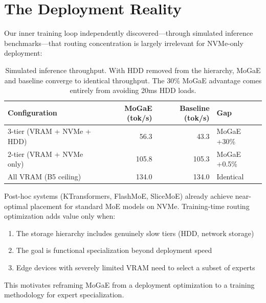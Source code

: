 \documentclass{article}
\begin{document}
\section{The Deployment Reality}

Our inner training loop independently discovered---through simulated inference benchmarks---that routing concentration is largely irrelevant for NVMe-only deployment:

\begin{table}[h]
\centering
\caption{Simulated inference throughput. With HDD removed from the hierarchy, MoGaE and baseline converge to identical throughput. The 30\% MoGaE advantage comes entirely from avoiding 20ms HDD loads.}
\label{tab:deployment}
\begin{tabular}{@{}lrrl@{}}
\toprule
Configuration & MoGaE (tok/s) & Baseline (tok/s) & Gap \\
\midrule
3-tier (VRAM + NVMe + HDD) & 56.3 & 43.3 & MoGaE +30\% \\
2-tier (VRAM + NVMe only) & 105.8 & 105.3 & MoGaE +0.5\% \\
All VRAM (B5 ceiling) & 134.0 & 134.0 & Identical \\
\bottomrule
\end{tabular}
\end{table}

Post-hoc systems (KTransformers, FlashMoE, SliceMoE) already achieve near-optimal placement for standard MoE models on NVMe. Training-time routing optimization adds value only when:
\begin{enumerate}
    \item The storage hierarchy includes genuinely slow tiers (HDD, network storage)
    \item The goal is functional specialization beyond deployment speed
    \item Edge devices with severely limited VRAM need to select a subset of experts
\end{enumerate}

This motivates reframing MoGaE from a deployment optimization to a training methodology for expert specialization.

\end{document}
